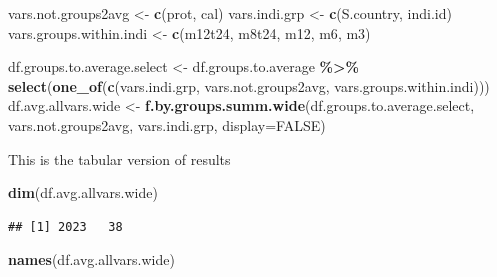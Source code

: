 \documentclass[
]{book}
\newenvironment{Shaded}{\begin{snugshade}}{\end{snugshade}}
\newcommand{\DataTypeTok}[1]{\textcolor[rgb]{0.13,0.29,0.53}{#1}}
\newcommand{\KeywordTok}[1]{\textcolor[rgb]{0.13,0.29,0.53}{\textbf{#1}}}
\newcommand{\NormalTok}[1]{#1}
\newcommand{\OperatorTok}[1]{\textcolor[rgb]{0.81,0.36,0.00}{\textbf{#1}}}
\newcommand{\OtherTok}[1]{\textcolor[rgb]{0.56,0.35,0.01}{#1}}
\newcommand{\StringTok}[1]{\textcolor[rgb]{0.31,0.60,0.02}{#1}}
\begin{document}
\begin{Shaded}
\begin{Highlighting}[]
\NormalTok{vars.not.groups2avg \textless{}{-}}\StringTok{ }\KeywordTok{c}\NormalTok{(}\StringTok{\textquotesingle{}prot\textquotesingle{}}\NormalTok{, }\StringTok{\textquotesingle{}cal\textquotesingle{}}\NormalTok{)}
\NormalTok{vars.indi.grp \textless{}{-}}\StringTok{ }\KeywordTok{c}\NormalTok{(}\StringTok{\textquotesingle{}S.country\textquotesingle{}}\NormalTok{, }\StringTok{\textquotesingle{}indi.id\textquotesingle{}}\NormalTok{)}
\NormalTok{vars.groups.within.indi \textless{}{-}}\StringTok{ }\KeywordTok{c}\NormalTok{(}\StringTok{\textquotesingle{}m12t24\textquotesingle{}}\NormalTok{, }\StringTok{\textquotesingle{}m8t24\textquotesingle{}}\NormalTok{, }\StringTok{\textquotesingle{}m12\textquotesingle{}}\NormalTok{, }\StringTok{\textquotesingle{}m6\textquotesingle{}}\NormalTok{, }\StringTok{\textquotesingle{}m3\textquotesingle{}}\NormalTok{)}

\NormalTok{df.groups.to.average.select \textless{}{-}}\StringTok{ }\NormalTok{df.groups.to.average }\OperatorTok{\%\textgreater{}\%}
\StringTok{                        }\KeywordTok{select}\NormalTok{(}\KeywordTok{one\_of}\NormalTok{(}\KeywordTok{c}\NormalTok{(vars.indi.grp,}
\NormalTok{                                        vars.not.groups2avg,}
\NormalTok{                                        vars.groups.within.indi)))}
\NormalTok{df.avg.allvars.wide \textless{}{-}}\StringTok{ }\KeywordTok{f.by.groups.summ.wide}\NormalTok{(df.groups.to.average.select,}
\NormalTok{                                             vars.not.groups2avg,}
\NormalTok{                                             vars.indi.grp, }\DataTypeTok{display=}\OtherTok{FALSE}\NormalTok{)}
\end{Highlighting}
\end{Shaded}

This is the tabular version of results

\begin{Shaded}
\begin{Highlighting}[]
\KeywordTok{dim}\NormalTok{(df.avg.allvars.wide)}
\end{Highlighting}
\end{Shaded}

\begin{verbatim}
## [1] 2023   38
\end{verbatim}

\begin{Shaded}
\begin{Highlighting}[]
\KeywordTok{names}\NormalTok{(df.avg.allvars.wide)}
\end{Highlighting}
\end{Shaded}
\end{document}
